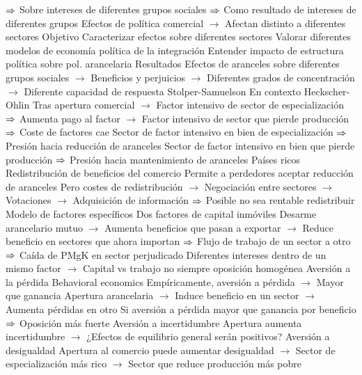 \documentclass{nuevotema}
\begin{document}
\begin{esquemal}
				\4[] $\Rightarrow$ Sobre intereses de diferentes grupos sociales
				\4[] $\Rightarrow$ Como resultado de intereses de diferentes grupos
				\4[] Efectos de política comercial
				\4[] $\to$ Afectan distinto a diferentes sectores
				\4 Objetivo
				\4[] Caracterizar efectos sobre diferentes sectores
				\4[] Valorar diferentes modelos de economía política de la integración
				\4[] Entender impacto de estructura política sobre pol. arancelaria
				\4 Resultados
				\4[] Efectos de aranceles sobre diferentes grupos sociales
				\4[] $\to$ Beneficios y perjuicios
				\4[] $\to$ Diferentes grados de concentración
				\4[] $\to$ Diferente capacidad de respuesta
			\3 Stolper-Samuelson
				\4 En contexto Heckscher-Ohlin
				\4 Tras apertura comercial
				\4[] $\to$ Factor intensivo de sector de especialización
				\4[] $\Rightarrow$ Aumenta pago al factor
				\4[] $\to$ Factor intensivo de sector que pierde producción
				\4[] $\Rightarrow$ Coste de factores cae
				\4 Sector de factor intensivo en bien de especialización
				\4[] $\Rightarrow$ Presión hacia reducción de aranceles
				\4 Sector de factor intensivo en bien que pierde producción
				\4[] $\Rightarrow$ Presión hacia mantenimiento de aranceles
				\4 Países ricos
			\3 Redistribución de beneficios del comercio
				\4 Permite a perdedores aceptar reducción de aranceles
				\4[] Pero costes de redistribución
				\4[] $\to$ Negociación entre sectores
				\4[] $\to$ Votaciones
				\4[] $\to$ Adquisición de información
				\4[] $\Rightarrow$ Posible no sea rentable redistribuir
			\3 Modelo de factores específicos
				\4 Dos factores de capital inmóviles
				\4 Desarme arancelario mutuo
				\4[] $\to$ Aumenta beneficios que pasan a exportar
				\4[] $\to$ Reduce beneficio en sectores que ahora importan
				\4[] $\Rightarrow$ Flujo de trabajo de un sector a otro
				\4[] $\Rightarrow$ Caída de PMgK en sector perjudicado
				\4 Diferentes intereses dentro de un mismo factor
				\4[] $\to$ Capital vs trabajo no siempre oposición homogénea
			\3 Aversión a la pérdida
				\4 Behavioral economics
				\4 Empíricamente, aversión a pérdida
				\4[] $\to$ Mayor que ganancia
				\4 Apertura arancelaria
				\4[] $\to$ Induce beneficio en un sector
				\4[] $\to$ Aumenta pérdidas en otro
				\4 Si aversión a pérdida mayor que ganancia por beneficio
				\4[] $\Rightarrow$ Oposición más fuerte
			\3 Aversión a incertidumbre
				\4 Apertura aumenta incertidumbre
				\4[] $\to$ ¿Efectos de equilibrio general serán positivos?
			\3 Aversión a desigualdad
				\4 Apertura al comercio puede aumentar desigualdad
				\4[] $\to$ Sector de especialización más rico
				\4[] $\to$ Sector que reduce producción más pobre

\end{esquemal}
\end{document}
